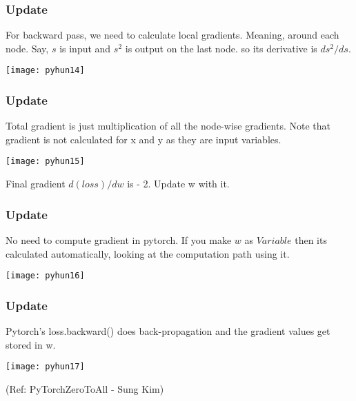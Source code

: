\begin{frame}[fragile] \frametitle{Update}
For backward pass, we need to calculate local gradients. Meaning, around each node.
Say, $s$ is input and $s^2$ is output on the last node. so its derivative is $ds^2/ds$.

\begin{center}
\texttt{[image: pyhun14]}
\end{center}


\end{frame}

\begin{frame}[fragile] \frametitle{Update}
Total gradient is just multiplication of all the node-wise gradients. Note that gradient is not calculated for x and y as they are input variables.

\begin{center}
\texttt{[image: pyhun15]}
\end{center}

Final gradient $d(loss)/dw$ is - 2. Update w with it.


\end{frame}


\begin{frame}[fragile] \frametitle{Update}
No need to compute gradient in pytorch. If you make $w$ as $Variable$ then its calculated automatically, looking at the computation path using it.

\begin{center}
\texttt{[image: pyhun16]}
\end{center}




\end{frame}

\begin{frame}[fragile] \frametitle{Update}
Pytorch's loss.backward() does back-propagation and the gradient values get stored in w.

\begin{center}
\texttt{[image: pyhun17]}
\end{center}


(Ref: PyTorchZeroToAll  - Sung Kim)
\end{frame}


